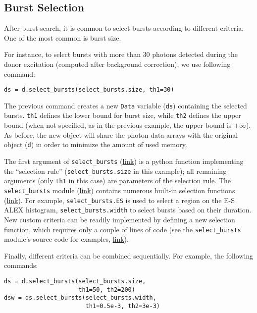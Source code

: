 \subsection{Burst Selection}
\label{sec:burstsel}

After burst search, it is common to select bursts according to different
criteria. One of the most common is burst size.

For instance, to select bursts with more than 30 photons detected during the donor excitation 
(computed after background correction), we use following command:

\begin{lstlisting}
ds = d.select_bursts(select_bursts.size, th1=30)
\end{lstlisting}

The previous command creates a new \verb|Data| variable (\verb|ds|) containing
the selected bursts. \verb|th1| defines the lower bound for burst size, while 
\verb|th2| defines the upper bound (when not specified, as in the previous example,
the upper bound is $+\infty$).
As before, the new object will share the photon data
arrays with the original object (\verb|d|) in order to minimize the amount 
of used memory.

The first argument of \verb|select_bursts|
(\href{http://fretbursts.readthedocs.org/en/latest/data_class.html#burst-selection-methods}{link})
is a python function implementing the ``selection rule'' (\verb|select_bursts.size| in this example);
all remaining arguments (only \verb|th1| in this case) are parameters of the selection rule.
The \verb|select_bursts| module
(\href{http://fretbursts.readthedocs.org/en/latest/burst_selection.html}{link})
contains numerous built-in selection functions
(\href{http://fretbursts.readthedocs.org/en/latest/burst_selection.html#module-fretbursts.select_bursts}{link}).
For example,
\verb|select_bursts.ES|
is used to select a region on the E-S ALEX histogram,
\verb|select_bursts.width|
to select bursts based on their duration.
New custom criteria can be readily implemented by defining a new selection function,
which requires only a couple of lines of code (see the
\verb|select_bursts| module's source code for examples,
\href{https://github.com/tritemio/FRETBursts/blob/master/fretbursts/select_bursts.py}{link}).

Finally, different criteria can be combined sequentially.
For example, the following commands:

\begin{lstlisting}
ds = d.select_bursts(select_bursts.size,
                     th1=50, th2=200)
dsw = ds.select_bursts(select_bursts.width,
                       th1=0.5e-3, th2=3e-3)
\end{lstlisting}

